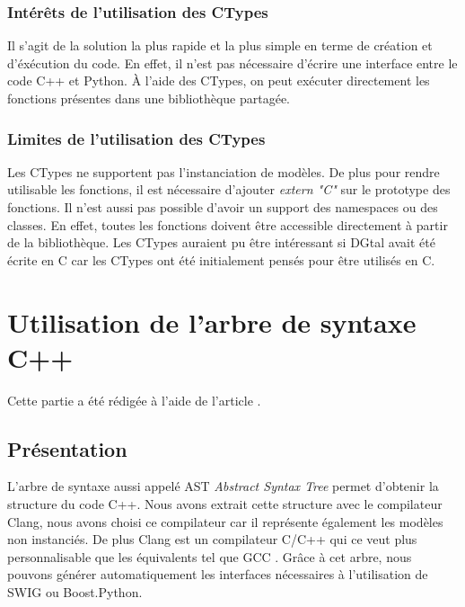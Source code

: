 \documentclass[11pt, french, screen]{report-rd-info}
\begin{document}
\subsubsection{Intérêts de l'utilisation des CTypes}

Il s'agit de la solution la plus rapide et la plus simple en terme de création et d'éxécution du code. En effet, il n'est pas nécessaire d'écrire une interface entre le code C++ et Python. À l'aide des CTypes, on peut exécuter directement les fonctions présentes dans une bibliothèque partagée.

\subsubsection{Limites de l'utilisation des CTypes}

Les CTypes ne supportent pas l'instanciation de modèles. De plus pour rendre utilisable les fonctions, il est nécessaire d'ajouter \emph{extern "C"} sur le prototype des fonctions. Il n'est aussi pas possible d'avoir un support des namespaces ou des classes. En effet, toutes les fonctions doivent être accessible directement à partir de la bibliothèque. Les CTypes auraient pu être intéressant si DGtal avait été écrite en C car les CTypes ont été initialement pensés pour être utilisés en C.

\section{Utilisation de l'arbre de syntaxe C++}

Cette partie a été rédigée à l'aide de l'article \cite{2014IACGWLTamas}.

\subsection{Présentation}

L'arbre de syntaxe aussi appelé AST \emph{Abstract Syntax Tree} permet d'obtenir la structure du code C++. Nous avons extrait cette structure avec le compilateur Clang, nous avons choisi ce compilateur car il représente également les modèles non instanciés. De plus Clang est un compilateur C/C++ qui ce veut plus personnalisable que les équivalents tel que GCC \cite{clangmain}. Grâce à cet arbre, nous pouvons générer automatiquement les interfaces nécessaires à l'utilisation de SWIG ou Boost.Python.


\end{document}
